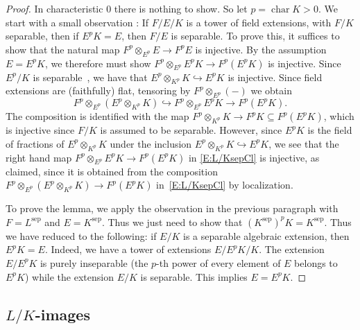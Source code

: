 \documentclass[11pt, reqno]{amsart}
\numberwithin{equation}{section}
\theoremstyle{definition}
\theoremstyle{remark}
\def\sep{{\text{sep}}}
\begin{document}
 \begin{proof} 
           In characteristic $0$ there is nothing to show.  So let
  $p=\operatorname{char}K>0$.
  We start with a small observation \cite[Exe.~4 p.V.165]{bourbakifields}: 
     If
  $F/E/K$ is a tower of field extensions, with $F/K$ separable, then if $E^pK=E$,
  then $F/E$ is separable.  To prove this, it suffices to show that the natural
  map $F^p\otimes_{E^p} E \to F^pE$ is injective. By the assumption $E=E^pK$, we
  therefore must show $F^p \otimes_{E^p}E^pK\to F^p(E^pK)$ is injective.   Since
  $E^p/K$ is separable~\cite[Prop.~8, p.V.116]{bourbakifields},
  we have that $E^p\otimes_{K^p}K\hookrightarrow E^pK$ is injective.   Since
  field extensions are (faithfully) flat, tensoring by $F^p\otimes_{E^p}(-)$ we
  obtain
  \begin{equation}\label{E:L/KsepCl}
  F^p \otimes_{E^p} (E^p \otimes_{K^p}K) \hookrightarrow F^p\otimes_{E^p}E^pK \to
  F^p(E^pK).
  \end{equation}
  The composition is identified with the map $F^p\otimes_{K^p}K\to F^pK\subseteq
  F^p(E^pK)$, which is injective since $F/K$ is assumed to be separable.  However,
  since $E^pK$ is the field of fractions of $E^p \otimes_{K^p} K$ under the
  inclusion $E^p \otimes_{K^p} K\hookrightarrow E^pK$, we see that the right hand
  map $ F^p \otimes_{E^p} E^pK \to F^p (E^pK)$ in \eqref{E:L/KsepCl} is injective,
  as claimed, since it is obtained from the composition   $F^p \otimes_{E^p} (E^p
  \otimes_{K^p}K)  \to F^p(E^pK)$ in~\eqref{E:L/KsepCl} by localization.

  To prove the lemma, we apply the observation in the previous paragraph with
  $F=L^{\sep}$ and $E=K^{\sep}$.  Thus we just need to show that
  $(K^{\sep})^pK=K^{\sep}$.    Thus we have reduced to the following: if $E/K$
  is a separable algebraic extension,  then $E^pK=E$. Indeed, we have a tower of
  extensions $E/E^pK / K$. The extension $E/E^pK$ is purely inseparable (the
  $p$-th power of every element of $E$ belongs to $E^pK$) while the extension
  $E/K$ is separable. This implies $E=E^pK$.
 \end{proof}



 \subsection{$L/K$-images} 
\end{document}
